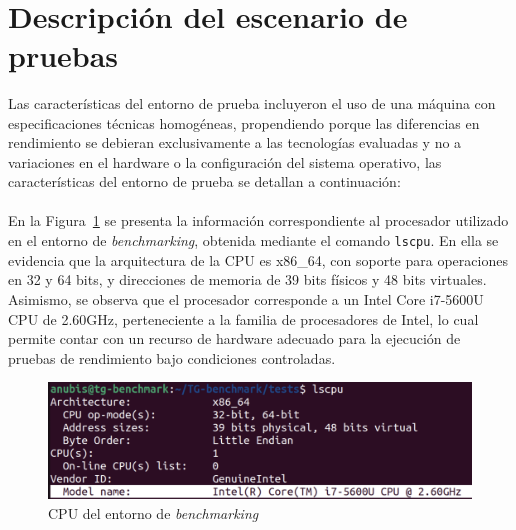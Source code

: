 \label{cap:benchmarking}

\mbox{}\\
\section{Descripción del escenario de pruebas}
\noindent
Las características del entorno de prueba incluyeron el uso de una máquina con especificaciones técnicas homogéneas, propendiendo  porque las diferencias en rendimiento se debieran exclusivamente a las tecnologías evaluadas y no a variaciones en el hardware o la configuración del sistema operativo, las características del entorno de prueba se detallan a continuación:\\ \\
\noindent
En la Figura~\ref{fig:CPU-benchmarking} se presenta la información correspondiente al procesador utilizado en el entorno de \textit{benchmarking}, obtenida mediante el comando \texttt{lscpu}. En ella se evidencia que la arquitectura de la CPU es x86\_64, con soporte para operaciones en 32 y 64 bits, y direcciones de memoria de 39 bits físicos y 48 bits virtuales. Asimismo, se observa que el procesador corresponde a un Intel Core i7-5600U CPU de 2.60GHz, perteneciente a la familia de procesadores de Intel, lo cual permite contar con un recurso de hardware adecuado para la ejecución de pruebas de rendimiento bajo condiciones controladas.
\begin{figure}[H]
    \centering
    \includegraphics[width=\textwidth,height=0.85\textheight,keepaspectratio]{apendices/ENV-BENCH/CPU.png}
    \caption{CPU del entorno de \textit{benchmarking}}\label{fig:CPU-benchmarking}
\end{figure}


